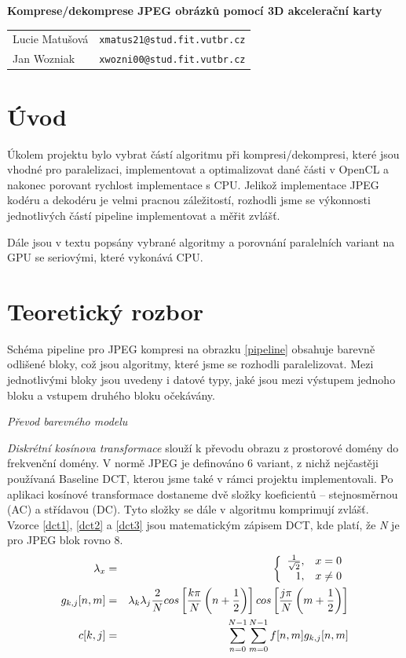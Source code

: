 \documentclass[a4paper,11pt]{article}
\begin{document}
\begin{center}{\LARGE\textbf{Komprese/dekomprese JPEG obrázků pomocí 3D akcelerační karty}}\\[0.2cm]
\newcommand{\autor}[2]{#1&\texttt{#2@stud.fit.vutbr.cz}\tabularnewline}
\begin{tabular}{ll}
    \autor{Lucie Matušová}{xmatus21}
    \autor{Jan Wozniak}{xwozni00}
\end{tabular}
\end{center}


\section{Úvod}
Úkolem projektu bylo vybrat částí algoritmu při kompresi/dekompresi, které jsou vhodné pro paralelizaci, implementovat
a optimalizovat dané části v OpenCL a nakonec porovant rychlost implementace s CPU. Jelikož implementace JPEG kodéru a
dekodéru je velmi pracnou záležitostí\cite{t81}, rozhodli jsme se výkonnosti jednotlivých částí pipeline implementovat
a měřit zvlášť.

Dále jsou v textu popsány vybrané algoritmy a porovnání paralelních variant na GPU se seriovými, které vykonává CPU.

\section{Teoretický rozbor} %
Schéma pipeline pro JPEG kompresi na obrazku \ref{pipeline} obsahuje barevně odlišené bloky, což jsou algoritmy,
které jsme se rozhodli paralelizovat. Mezi jednotlivými bloky jsou uvedeny i datové typy, jaké jsou mezi výstupem
jednoho bloku a vstupem druhého bloku očekávány.

\textit{Převod barevného modelu}

\textit{Diskrétní kosínova transformace} slouží k převodu obrazu z prostorové domény do frekvenční domény. V normě JPEG
je definováno 6 variant, z nichž nejčastěji používaná Baseline DCT, kterou jsme také v rámci projektu implementovali\cite{mul}. 
Po aplikaci kosínové transformace dostaneme dvě složky koeficientů -- stejnosměrnou (AC) a střídavou (DC). Tyto složky
se dále v algoritmu komprimují zvlášť. Vzorce \ref{dct1}, \ref{dct2} a \ref{dct3} jsou matematickým zápisem DCT,
kde platí, že \textit{N} je pro JPEG blok rovno 8.
\begin{eqnarray}
\lambda_x &=& \left\{ \begin{array}{r@{\quad}c}
    \frac{1}{\sqrt{2}}, & x = 0 \\
    1, & x \neq 0\\ 
\end{array} \right.\label{dct1}\\
g_{k,j}[n,m] &=& \lambda_k \lambda_j \frac{2}{N} cos\left[\frac{k \pi}{N}\left(n+\frac{1}{2}\right)\right] cos\left[\frac{j \pi}{N}\left(m+\frac{1}{2}\right)\right]\label{dct2}\\
c[k,j] &=& \sum^{N-1}_{n=0}{\sum^{N-1}_{m=0}{f[n,m]g_{k,j}[n,m]}}\label{dct3}
\end{eqnarray}
\end{document}
